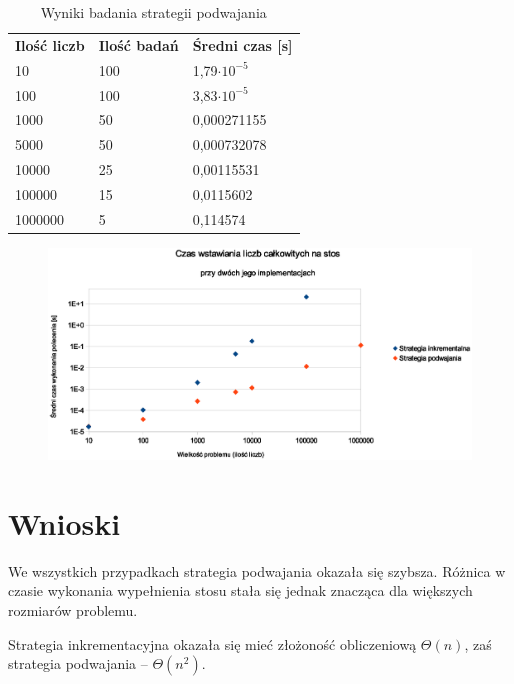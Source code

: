 \documentclass[a4paper,10pt]{article}
\begin{document}
\begin{center}
\begin{table}[h]
\caption{Wyniki badania strategii podwajania}
\begin{tabular}{lll}
\textbf{Ilość liczb} & \textbf{Ilość badań} & \textbf{Średni czas [s]}\\
10 & 100 & 1,79\(\cdot 10^{-5}\)\\
100 & 100 & 3,83\(\cdot 10^{-5}\)\\
1000 & 50 & 0,000271155\\
5000 & 50 & 0,000732078\\
10000 & 25 & 0,00115531\\
100000 & 15 & 0,0115602\\
1000000 & 5 & 0,114574
\end{tabular}
\end{table}
\end{center}

\begin{figure}[h]
 \includegraphics[width=\textwidth]{wykr.eps}
\end{figure}

\section{Wnioski}
\par We wszystkich przypadkach strategia podwajania okazała się szybsza.
Różnica w czasie wykonania wypełnienia stosu stała się jednak znacząca
dla większych rozmiarów problemu.

\par Strategia inkrementacyjna okazała się mieć złożoność obliczeniową 
\(\Theta(n)\), zaś strategia podwajania -- \(\Theta(n^{2})\).
\end{document}
